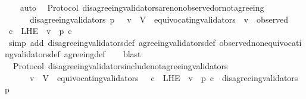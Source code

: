 \begin{isabellebody}
\ \ \isamarkupfalse%
\ auto%
\endisatagproof
{\isafoldproof}%
%
\isadelimproof
\isanewline
%
\endisadelimproof
\isanewline
{}\isamarkupfalse%
\ {\isacharparenleft}\ Protocol{\isacharparenright}\ disagreeing{\isacharunderscore}validators{\isacharunderscore}are{\isacharunderscore}non{\isacharunderscore}observed{\isacharunderscore}or{\isacharunderscore}not{\isacharunderscore}agreeing\ {\isacharcolon}\isanewline
\ \ {\isachardoublequoteopen}{\isasymforall}\ {\isasymsigma}\ {\isasymin}\ {\isasymSigma}{\isachardot}\ disagreeing{\isacharunderscore}validators\ {\isacharparenleft}p{\isacharcomma}\ {\isasymsigma}{\isacharparenright}\ {\isacharequal}\ {\isacharbraceleft}v\ {\isasymin}\ V\ {\isacharminus}\ equivocating{\isacharunderscore}validators\ {\isasymsigma}{\isachardot}\ v\ {\isasymnotin}\ observed\ {\isasymsigma}\ {\isasymor}\ {\isacharparenleft}{\isasymexists}\ c\ {\isasymin}\ L{\isacharunderscore}H{\isacharunderscore}E\ {\isasymsigma}\ v{\isachardot}\ {\isasymnot}\ p\ c{\isacharparenright}{\isacharbraceright}{\isachardoublequoteclose}\isanewline
%
\isadelimproof
\ \ %
\endisadelimproof
%
\isatagproof
{}\isamarkupfalse%
\ {\isacharparenleft}simp\ add{\isacharcolon}\ disagreeing{\isacharunderscore}validators{\isacharunderscore}def\ agreeing{\isacharunderscore}validators{\isacharunderscore}def\ observed{\isacharunderscore}non{\isacharunderscore}equivocating{\isacharunderscore}validators{\isacharunderscore}def\ agreeing{\isacharunderscore}def{\isacharparenright}\isanewline
\ \ \isamarkupfalse%
\ blast%
\endisatagproof
{\isafoldproof}%
%
\isadelimproof
\isanewline
%
\endisadelimproof
\isanewline
{}\isamarkupfalse%
\ {\isacharparenleft}\ Protocol{\isacharparenright}\ disagreeing{\isacharunderscore}validators{\isacharunderscore}include{\isacharunderscore}not{\isacharunderscore}agreeing{\isacharunderscore}validators\ {\isacharcolon}\isanewline
\ \ {\isachardoublequoteopen}{\isasymforall}\ {\isasymsigma}\ {\isasymin}\ {\isasymSigma}{\isachardot}\ {\isacharbraceleft}v\ {\isasymin}\ V\ {\isacharminus}\ equivocating{\isacharunderscore}validators\ {\isasymsigma}{\isachardot}\ {\isasymexists}\ c\ {\isasymin}\ L{\isacharunderscore}H{\isacharunderscore}E\ {\isasymsigma}\ v{\isachardot}\ {\isasymnot}\ p\ c{\isacharbraceright}\ {\isasymsubseteq}\ disagreeing{\isacharunderscore}validators\ {\isacharparenleft}p{\isacharcomma}\ {\isasymsigma}{\isacharparenright}{\isachardoublequoteclose}\isanewline
%
\isadelimproof
\ \ %
\endisadelimproof
%
\isatagproof
{}\isamarkupfalse%

\end{isabellebody}
